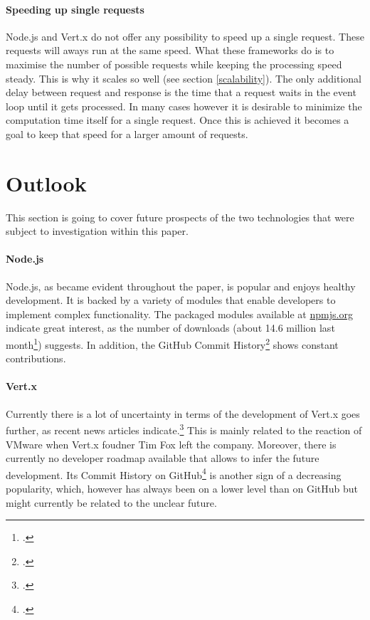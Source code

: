 \paragraph{Speeding up single requests}
Node.js and Vert.x do not offer any possibility to speed up a single request.
These requests will aways run at the same speed. What these frameworks do is to
maximise the number of possible requests while keeping the processing speed
steady. This is why it scales so well (see section \ref{scalability}). The only
additional delay between request and response is the time that a request waits
in the event loop until it gets processed.  In many cases however it is
desirable to minimize the computation time itself for a single request. Once
this is achieved it becomes a goal to keep that speed for a larger amount of
requests.\\


\section{Outlook}

This section is going to cover future prospects of the two technologies that were subject to investigation within this paper.\\

\paragraph{Node.js} Node.js, as became evident throughout the paper, is popular and enjoys healthy development. It is backed by a variety of modules that enable developers to implement complex functionality. The packaged modules available at \url{npmjs.org} indicate great interest, as the number of downloads (about 14.6 million last month\footcite[Cf.][]{node_packages}) suggests. In addition, the GitHub Commit History\footcite[Cf.][]{vertxcommithistory_2013} shows constant contributions. 

\paragraph{Vert.x} Currently there is a lot of uncertainty in terms of the development of Vert.x goes further, as recent news articles indicate.\footcite[Cf.][]{Asay_2013} This is mainly related to the reaction of VMware when Vert.x foudner Tim Fox left the company. Moreover, there is currently no developer roadmap available that allows to infer the future development. Its Commit History on GitHub\footcite[Cf.][]{vertxcommithistory_2013} is another sign of a decreasing popularity, which, however has always been on a lower level than on GitHub but might currently be related to the unclear future.

